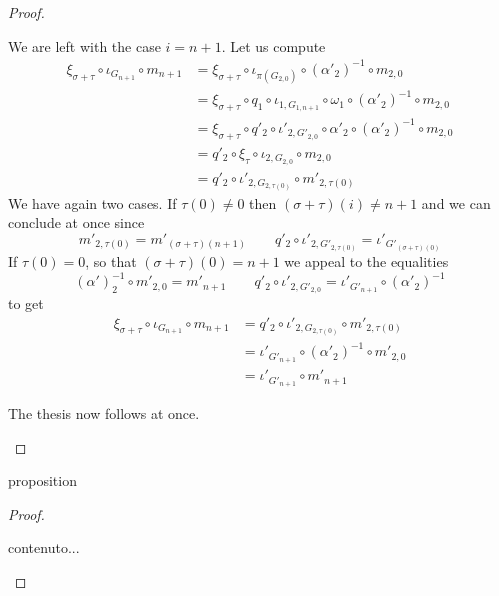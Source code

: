 \documentclass[a4paper,UKenglish,cleveref,pdftex, thm-restate,numberwithinsect]{lipics}
\begin{document}
\begin{proof}
\begin{itemize}
\begin{itemize}
	We are left with the case $i=n+1$. Let us compute
	\begin{align*}
		\xi_{\sigma+\tau}\circ \iota_{G_{n+1}} \circ m_{n+1} &= \xi_{\sigma+\tau} \circ \iota_{\pi(G_{2,0})} \circ (\alpha'_2)^{-1}\circ m_{2,0}\\&=\xi_{\sigma+\tau} \circ q_1\circ \iota_{1, G_{1,n+1}} \circ \omega_1 \circ (\alpha'_2)^{-1}\circ m_{2,0}\\&=\xi_{\sigma+\tau} \circ q'_2 \circ \iota'_{2,G'_{2,0}} \circ \alpha'_2 \circ (\alpha'_2)^{-1}\circ m_{2,0} \\&=q'_2 \circ \xi_\tau \circ \iota_{2, G_{2,0}} \circ m_{2,0}\\&=q'_2\circ \iota'_{2, G_{2,\tau(0)}} \circ m'_{2,\tau(0)}
	\end{align*}
	We have again two cases. If $\tau(0)\neq 0$ then $(\sigma+\tau)(i)\neq n+1$ and we can conclude at once since 
	\[m'_{2, \tau(0)}=m'_{(\sigma+\tau)(n+1)} \qquad q'_2\circ \iota'_{2, G'_{2,\tau(0)}}=
	\iota'_{G'_{(\sigma+\tau)(0)}}\] 
	If $\tau(0)=0$, so that  $(\sigma+\tau)(0)= n+1$ we appeal to the equalities
	\[(\alpha')^{-1}_2\circ m'_{2, 0}=m'_{n+1} \qquad q'_2\circ \iota'_{2, G'_{2, 0}}=
	\iota'_{G'_{n+1}}\circ (\alpha'_2)^{-1}\] 
	to get
	\begin{align*}
		\xi_{\sigma+\tau}\circ \iota_{G_{n+1}} \circ m_{n+1} &= q'_2\circ \iota'_{2, G_{2,\tau(0)}} \circ m'_{2,\tau(0)}\\&=	\iota'_{G'_{n+1}}\circ (\alpha'_2)^{-1}\circ m'_{2,0}\\&=\iota'_{G'_{n+1}}\circ  m'_{n+1}
	\end{align*}
\end{itemize}
The thesis now follows at once.	 \qedhere 
\end{itemize} \end{proof}

\fi 




\begin{theoremEnd}[category=sec2]{proposition}\label{prop:derpo}
\end{theoremEnd}
\begin{proof}
	\begin{proofEnd}
		contenuto...\qedhere 
	\end{proofEnd}
\end{proof}
\end{document}
